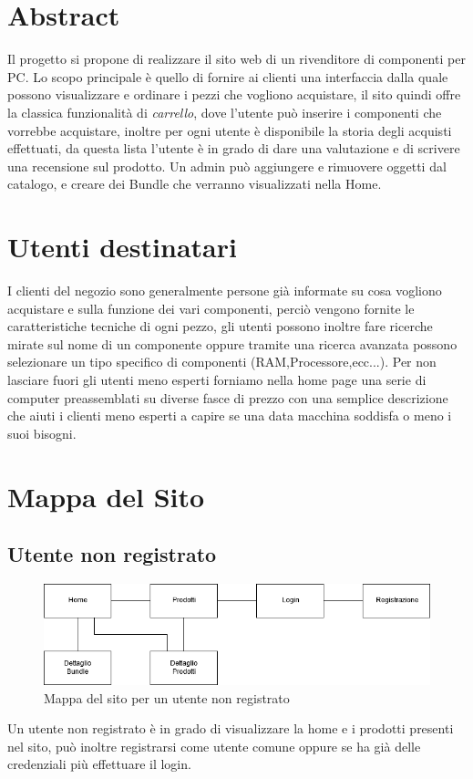 \section{Abstract}
Il progetto si propone di realizzare il sito web di un rivenditore di componenti per PC.
Lo scopo principale è quello di fornire ai clienti una interfaccia dalla quale possono visualizzare e ordinare i pezzi che vogliono acquistare, il sito quindi offre la classica funzionalità di \emph{carrello}, dove l'utente può inserire i componenti che vorrebbe acquistare, inoltre per ogni utente è disponibile la storia degli acquisti effettuati, da questa lista l'utente è in grado di dare una valutazione e di scrivere una recensione sul prodotto.
Un admin può aggiungere e rimuovere oggetti dal catalogo, e creare dei Bundle che verranno visualizzati nella Home.

\section{Utenti destinatari}
I clienti del negozio sono generalmente persone già informate su cosa vogliono acquistare e sulla funzione dei vari componenti, perciò vengono fornite le caratteristiche tecniche di ogni pezzo, gli utenti possono inoltre fare ricerche mirate sul nome di un componente oppure tramite una ricerca avanzata possono selezionare un tipo specifico di componenti (RAM,Processore,ecc...).
Per non lasciare fuori gli utenti meno esperti forniamo nella home page una serie di computer preassemblati su diverse fasce di prezzo con una semplice descrizione che aiuti i clienti meno esperti a capire se una data macchina soddisfa o meno i suoi bisogni.
\newpage
\section{Mappa del Sito}
\subsection{Utente non registrato}
\begin{figure}[h]
	\label{UNR} 
	\centering 
	\includegraphics[width=1\textwidth]{immagini/UNR.png}
	\caption{Mappa del sito per un utente non registrato} 
\end{figure}
Un utente non registrato è in grado di visualizzare la home e i prodotti presenti nel sito, può inoltre registrarsi come utente comune oppure se ha già delle credenziali più effettuare il login.

